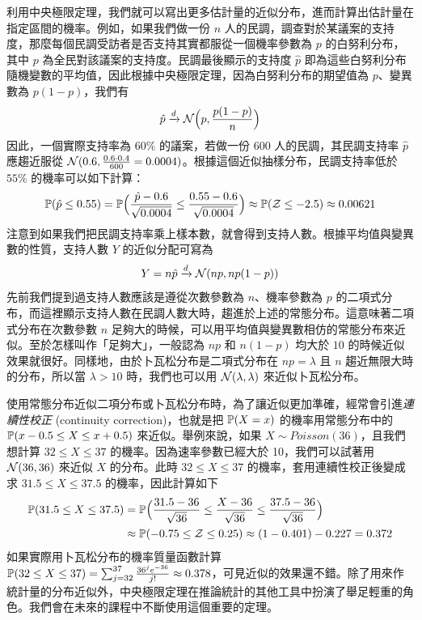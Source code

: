     利用中央極限定理，我們就可以寫出更多估計量的近似分布，進而計算出估計量在指定區間的機率。例如，如果我們做一份 $n$ 人的民調，調查對於某議案的支持度，那麼每個民調受訪者是否支持其實都服從一個機率參數為 $p$ 的白努利分布，其中 $p$ 為全民對該議案的支持度。民調最後顯示的支持度 $\hat{p}$ 即為這些白努利分布隨機變數的平均值，因此根據中央極限定理，因為白努利分布的期望值為 $p$、變異數為 $p(1-p)$，我們有
    \[\hat{p} \xrightarrow[]{d} \mathcal{N}\Big(p, \frac{p(1-p)}{n}\Big)\]
    因此，一個實際支持率為 $60\%$ 的議案，若做一份 $600$ 人的民調，其民調支持率 $\hat{p}$ 應趨近服從 $\mathcal{N}(0.6, \frac{0.6 \cdot 0.4}{600} = 0.0004)$。根據這個近似抽樣分布，民調支持率低於 $55\%$ 的機率可以如下計算：
    \[\mathbb{P}(\hat{p} \le 0.55) = \mathbb{P}\Big(\frac{\hat{p}-0.6}{\sqrt{0.0004}} \le \frac{0.55-0.6}{\sqrt{0.0004}}\Big) \approx \mathbb{P}(\mathcal{Z} \le -2.5) \approx 0.00621\]
    注意到如果我們把民調支持率乘上樣本數，就會得到支持人數。根據平均值與變異數的性質，支持人數 $Y$ 的近似分配可寫為
    \[Y = n\hat{p} \xrightarrow[]{d} \mathcal{N}(np, np(1-p))\]
    先前我們提到過支持人數應該是遵從次數參數為 $n$、機率參數為 $p$ 的二項式分布，而這裡顯示支持人數在民調人數大時，趨進於上述的常態分布。這意味著二項式分布在次數參數 $n$ 足夠大的時候，可以用平均值與變異數相仿的常態分布來近似。至於怎樣叫作「足夠大」，一般認為 $np$ 和 $n(1-p)$ 均大於 $10$ 的時候近似效果就很好。同樣地，由於卜瓦松分布是二項式分布在 $np=\lambda$ 且 $n$ 趨近無限大時的分布，所以當 $\lambda > 10$ 時，我們也可以用 $\mathcal{N}(\lambda, \lambda)$ 來近似卜瓦松分布。

    使用常態分布近似二項分布或卜瓦松分布時，為了讓近似更加準確，經常會引進\textit{連續性校正} (continuity correction)，也就是把 $\mathbb{P}(X = x)$ 的機率用常態分布中的 $\mathbb{P}(x-0.5 \le X \le x + 0.5)$ 來近似。舉例來說，如果 $X \sim Poisson(36)$，且我們想計算 $32 \le X \le 37$ 的機率。因為速率參數已經大於 10，我們可以試著用 $\mathcal{N}(36, 36)$ 來近似 $X$ 的分布。此時 $32 \le X \le 37$ 的機率，套用連續性校正後變成求 $31.5 \le X \le 37.5$ 的機率，因此計算如下
    \begin{align*}
        \mathbb{P}(31.5 \le X \le 37.5) &= \mathbb{P}\Big(\frac{31.5-36}{\sqrt{36}} \le \frac{X-36}{\sqrt{36}} \le \frac{37.5-36}{\sqrt{36}}\Big)\\
        &\approx \mathbb{P}(-0.75 \le \mathcal{Z} \le 0.25) \approx (1-0.401)-0.227 = 0.372
    \end{align*}
    如果實際用卜瓦松分布的機率質量函數計算 $\mathbb{P}(32 \le X \le 37) = \sum_{j=32}^{37} \frac{36^j e^{-36}}{j!} \approx 0.378$，可見近似的效果還不錯。除了用來作統計量的分布近似外，中央極限定理在推論統計的其他工具中扮演了舉足輕重的角色。我們會在未來的課程中不斷使用這個重要的定理。

